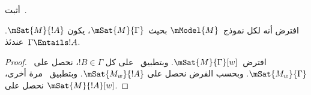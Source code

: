 \documentclass[../../../include/open-logic-section]{subfiles}
\begin{document}
\begin{prob}
  أثبت~.
\end{prob}

\begin{prop}
  افترض أنه لكل نموذج~$\mModel{M}$ بحيث~$\mSat{M}{\Gamma}$، يكون
  $\mSat{M}{!A}$. عندئذ~$\Gamma \Entails !A$.
\end{prop}

\begin{proof}
  افترض~$\mSat{M}{\Gamma}[w]$. وبتطبيق~ على كل
  $!B \in \Gamma$، نحصل على~$\mSat{M_w}{\Gamma}$. وبحسب الفرض نحصل على
  $\mSat{M_w}{!A}$. وبتطبيق~ مرة أخرى، نحصل على
  $\mSat{M}{!A}[w]$.
\end{proof}
\end{document}
